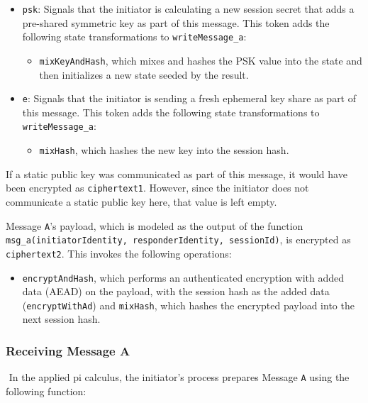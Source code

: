 \begin{itemize}

\item \texttt{psk}: Signals that the initiator is calculating a new session secret that adds a pre-shared symmetric key as part of this message. This token adds the following state transformations to \texttt{writeMessage\_a}:
\begin{itemize}

\item  \texttt{mixKeyAndHash}, which mixes and hashes the PSK value into the state and then initializes a new state seeded by the result.
\end{itemize}


\item \texttt{e}: Signals that the initiator is sending a fresh ephemeral key share as part of this message. This token adds the following state transformations to \texttt{writeMessage\_a}:
\begin{itemize}

\item \texttt{mixHash}, which hashes the new key into the session hash.
\end{itemize}


\end{itemize}
If a static public key was communicated as part of this message, it would have been encrypted as \texttt{ciphertext1}. However, since the initiator does not communicate a static public key here, that value is left empty.


Message \texttt{A}'s payload, which is modeled as the output of the function \texttt{msg\_a(initiatorIdentity, responderIdentity, sessionId)}, is encrypted as \texttt{ciphertext2}. This invokes the following operations:


\begin{itemize}

\item \texttt{encryptAndHash}, which performs an authenticated encryption with added data (AEAD) on the payload, with the session hash as the added data (\texttt{encryptWithAd}) and \texttt{mixHash}, which hashes the encrypted payload into the next session hash.

\end{itemize}
\subsubsection{Receiving Message A}$ $
In the applied pi calculus, the initiator's process prepares Message \texttt{A} using the following function:


